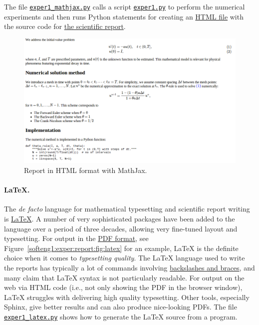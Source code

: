 \documentclass[%
oneside,                 %
final,                   %
10pt]{article}
\begin{document}
The file \href{{http://tinyurl.com/p96acy2/report_generation/exper1_html.py}}{\nolinkurl{exper1_mathjax.py}}
calls a script
\href{{http://tinyurl.com/p96acy2/exper1.py}}{\nolinkurl{exper1.py}}
to perform the numerical experiments and then runs Python
statements for creating an \href{{http://tinyurl.com/nc4upel/_static/report_mathjax.html.html}}{HTML file} with the source code for \href{{http://tinyurl.com/nc4upel/_static/report_mathjax.html}}{the scientific report}.


\begin{figure}[!ht]  %
  \centerline{\includegraphics[width=0.9\linewidth]{fig-softeng/report_mathjax.png}}
  \caption{
  Report in HTML format with MathJax. \label{softeng1:exper:report:fig:mathjax}
  }
\end{figure}



\paragraph{{\LaTeX}.}

The \emph{de facto} language for mathematical typesetting and scientific
report writing is \href{{http://en.wikipedia.org/wiki/LaTeX}}{LaTeX}. A
number of very sophisticated packages have been added to the language
over a period of three decades, allowing very fine-tuned layout and
typesetting. For output in the \href{{http://tinyurl.com/nc4upel/_static/report.pdf}}{PDF format}, see Figure~\ref{softeng1:exper:report:fig:latex} for an example, {\LaTeX} is the
definite choice when it comes to \emph{typesetting quality}.
The {\LaTeX} language used to
write the reports has typically a lot of commands involving
\href{{http://tinyurl.com/nc4upel/_static/report.tex.html}}{backslashes and braces}, and many claim that
{\LaTeX} syntax is not particularly readable.  For output on the web via
HTML code (i.e., not only showing the PDF in the browser window), {\LaTeX}
struggles with delivering high quality typesetting. Other tools,
especially Sphinx, give better results and can also produce
nice-looking PDFs.  The file \href{{http://tinyurl.com/p96acy2/report_generation/exper1_latex.py}}{\nolinkurl{exper1_latex.py}} shows how to
generate the {\LaTeX} source from a program.
\end{document}
